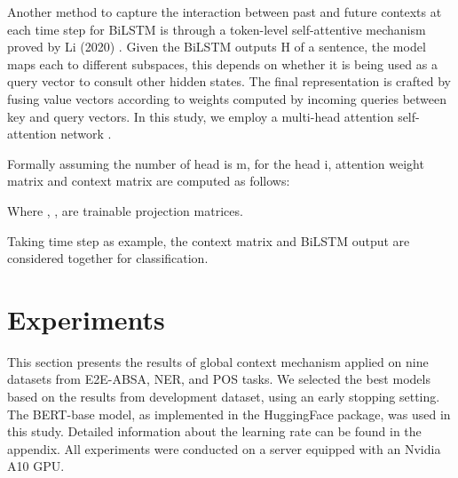 \documentclass[lettersize,journal]{IEEEtran}
\begin{document}
\begin{table}[]
\centering
{}
\caption{Result on POS tagging.\label{tab:table6}}
\end{table}

Another method to capture the interaction between past and future contexts at each time step for BiLSTM is through a token-level self-attentive mechanism proved by Li  (2020) \cite{Li2020}. Given the BiLSTM outputs H of a sentence, the model maps each  to different subspaces, this depends on whether it is being used as a query vector to consult other hidden states. The final representation is crafted by fusing value vectors according to weights computed by incoming queries between key and query vectors. In this study, we employ a multi-head attention self-attention network \cite{Vaswani2017}.

Formally assuming the number of head is m, for the head i, attention weight matrix  and context matrix  are computed as follows:

Where , ,  are trainable projection matrices.

Taking time step  as example, the context matrix  and BiLSTM output  are considered together for classification.



\section{Experiments}
This section presents the results of global context mechanism applied on nine datasets from E2E-ABSA, NER, and POS tasks. We selected the best models based on the results from development dataset, using an early stopping setting. The BERT-base model, as implemented in the HuggingFace package, was used in this study. Detailed information about the learning rate can be found in the appendix. All experiments were conducted on a server equipped with an Nvidia A10 GPU.
\end{document}
